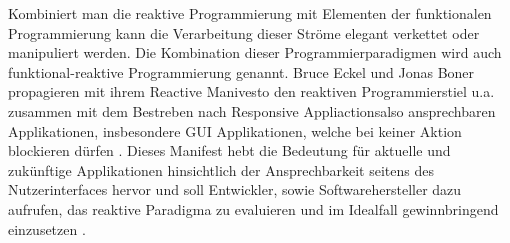 \documentclass[12pt,oneside,a4paper,bibtotoc,liststotoc]{scrreprt}
\begin{document}
Kombiniert man die reaktive Programmierung mit Elementen der funktionalen Programmierung kann die Verarbeitung dieser Ströme elegant verkettet oder manipuliert werden. Die Kombination dieser Programmierparadigmen wird auch funktional-reaktive Programmierung genannt.
\newline
\newline
\newline
Bruce Eckel und Jonas Boner propagieren mit ihrem Reactive Manivesto den reaktiven Programmierstiel u.a. zusammen mit dem Bestreben nach \glqq Responsive Appliactions\grqq also ansprechbaren Applikationen, insbesondere GUI Applikationen, welche bei keiner Aktion blockieren dürfen \cite{heiseReactiveManifesto}. Dieses Manifest hebt die Bedeutung für aktuelle und zukünftige Applikationen hinsichtlich der Ansprechbarkeit seitens des Nutzerinterfaces hervor und soll Entwickler, sowie Softwarehersteller dazu aufrufen, das reaktive Paradigma zu evaluieren und im Idealfall gewinnbringend einzusetzen \cite{reactiveManifesto}.
\end{document}
